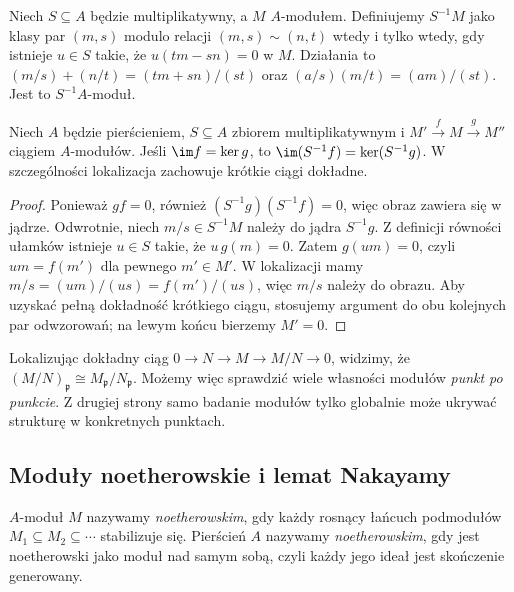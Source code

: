 \begin{definicja}
Niech $S\subseteq A$ będzie multiplikatywny, a $M$
$A$-modułem. Definiujemy $S^{-1}M$ jako klasy par
$(m,s)$ modulo relacji
$(m,s)\sim(n,t)$ wtedy i tylko wtedy, gdy istnieje
$u\in S$ takie, że $u(tm-sn)=0$ w $M$.
Działania to $(m/s)+(n/t)=(tm+sn)/(st)$ oraz
$(a/s)(m/t)=(am)/(st)$. Jest to $S^{-1}A$-moduł.
\end{definicja}

\begin{twierdzenie}
\label{tw:loc-exact}
Niech $A$ będzie pierścieniem, $S\subseteq A$ zbiorem
multiplikatywnym i
$M'\xrightarrow{f}M\xrightarrow{g}M''$ ciągiem
$A$-modułów. Jeśli $\im f=\ker g$, to
$\im(S^{-1}f)=\ker(S^{-1}g)$. W szczególności
lokalizacja zachowuje krótkie ciągi dokładne.
\end{twierdzenie}
\begin{proof}
Ponieważ $gf=0$, również $(S^{-1}g)(S^{-1}f)=0$,
więc obraz zawiera się w jądrze. Odwrotnie,
niech $m/s\in S^{-1}M$ należy do jądra
$S^{-1}g$. Z definicji równości ułamków istnieje
$u\in S$ takie, że $u\,g(m)=0$. Zatem
$g(um)=0$, czyli $um=f(m')$ dla pewnego $m'\in M'$.
W lokalizacji mamy
$m/s=(um)/(us)=f(m')/(us)$, więc $m/s$
należy do obrazu. Aby uzyskać pełną dokładność
krótkiego ciągu, stosujemy argument do obu kolejnych
par odwzorowań; na lewym końcu bierzemy $M'=0$.
\end{proof}

\begin{uwaga}
Lokalizując dokładny ciąg
$0\to N\to M\to M/N\to0$,
widzimy, że $(M/N)_{\mathfrak p}\cong
M_{\mathfrak p}/N_{\mathfrak p}$. Możemy więc
sprawdzić wiele własności modułów \emph{punkt po punkcie}.
Z drugiej strony samo badanie modułów tylko globalnie
może ukrywać strukturę w konkretnych punktach.
\end{uwaga}

\subsection{Moduły noetherowskie i lemat Nakayamy}
\begin{definicja}
$A$-moduł $M$ nazywamy \emph{noetherowskim},
gdy każdy rosnący łańcuch podmodułów
$M_1\subseteq M_2\subseteq\cdots$ stabilizuje się.
Pierścień $A$ nazywamy \emph{noetherowskim},
gdy jest noetherowski jako moduł nad samym sobą,
czyli każdy jego ideał jest skończenie generowany.
\end{definicja}

